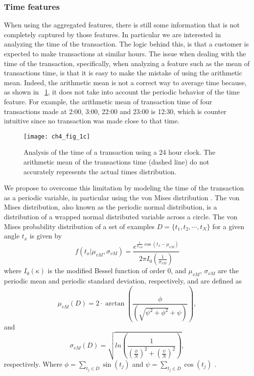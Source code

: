 	\subsubsection{Time features}
	\label{sec:4:frad:features_time}
	
  When using the aggregated features, there is still some information that is not completely 
  captured by those features. In particular we are interested in analyzing the time of the 
  transaction. The logic behind this, is that a customer is expected to make transactions at 
  similar hours. The issue when dealing with the time of the transaction, 
  specifically, when analyzing a feature such as the mean of transactions time, is that it is easy 
  to make the mistake of using the arithmetic mean. Indeed, the arithmetic mean is not a correct 
  way to average time because, as shown in \figurename{~\ref{fig:4:von1}}, it does not take into 
  account the periodic behavior of the time feature. For example, the arithmetic mean of 
  transaction time of four transactions made at 2:00, 3:00, 22:00 and 23:00 is 12:30, which is 
  counter intuitive since no transaction was made close to that time.

  \begin{figure}[!t]
  \centering
  \texttt{[image: ch4\_fig\_1c]}
  \caption{Analysis of the time of a transaction using a 24 hour clock. The arithmetic mean of the 
  transactions time (dashed line) do not accurately represents the actual times distribution.}
  \label{fig:4:von1}
  \end{figure} 
  
  We propose to overcome this limitation by modeling the time of the transaction as a periodic 
  variable, in particular using the von Mises distribution \citep{Fisher1996}. The von Mises 
  distribution, also known   as the periodic normal distribution, is a distribution of a wrapped 
  normal distributed  variable across a circle. The von Mises probability distribution of a 
  set of examples $D=\{t_1,t_2,\cdots,t_N\}$ for a given angle $t_x$ is given by
  \begin{equation}
    f\left(t_x\vert \mu_{vM} , \sigma_{vM} \right) = \frac{e^{\frac{1}{\sigma_{vM}} \cos(t_x - 
\mu_{vM})}}{2 \pi I_0\left(\frac{1}{\sigma_{vM}}\right)}
  \end{equation}
  where  $I_0(\kappa)$ is the modified Bessel function of order 0, 
and   $\mu_{vM}$, $\sigma_{vM}$ are the periodic mean and periodic standard deviation, 
  respectively, and are defined as
  \begin{equation}
    \mu_{vM}(D) =  2\cdot \arctan\left(\frac{\phi}{\left(
    \sqrt{\psi^2 + \phi^2} +  \psi \right)} \right),
  \end{equation}
  and
  \begin{equation}
    \sigma_{vM}(D) = \sqrt{ ln\left( \frac{1}{
    \left(\frac{\phi}{N} \right)^2  + \left(\frac{\psi}{N} \right)^2 } \right) },
  \end{equation}
  respectively. Where $\phi=\sum_{t_j \in D} \sin(t_j)$ and $\psi=\sum_{t_j \in D }\cos(t_j)$ 
  \citep{Bishop2006}. 
  
